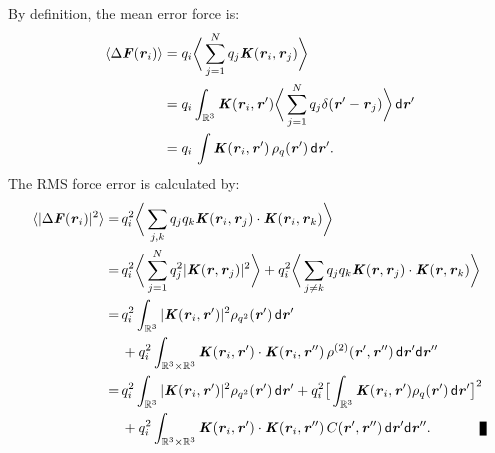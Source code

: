 \documentclass[aps,pre,preprint]{revtex4}
\renewcommand{\v}[1]{\textbf{\textit{#1}}}
\renewcommand{\d}[1]{\textsf{#1}}
\newenvironment{proof}[1][Proof]{\begin{trivlist}
\item[\hskip \labelsep {\bfseries #1}]}{\end{trivlist}}
\newcommand{\qed}{\nobreak \ifvmode \relax \else
      \ifdim\lastskip<1.5em \hskip-\lastskip
      \hskip1.5em plus0em minus0.5em \fi \nobreak
      \vrule height0.75em width0.5em depth0.25em\fi}
\begin{document}
\begin{proof}
  By definition, the mean error force is:
  \begin{align*}
    \langle\Delta\v F(\v r_i)\rangle
    &=
    q_i\bigg\langle \sum_{j=1}^Nq_j\v K(\v r_i,\v r_j)\bigg\rangle\\
    &=
    q_i\int_{\mathbb R^3}\v K(\v r_i, \v r')
    \bigg\langle \sum_{j=1}^Nq_j\delta (\v r' -\v r_j)\bigg\rangle
    \,\d d\v r'\\
    &= 
    q_i\,\int\v K(\v r_i,\v r')\,\rho_q(\v r')\,\d d\v r'.
  \end{align*}
  The RMS force error is calculated by:
  \begin{align} \nonumber
    \langle\vert\Delta\v F(\v r_i)\vert^2\rangle
    =\,&
    q_i^2\bigg\langle\sum_{j,k}
    q_jq_k\v K(\v r_i, \v r_j)\cdot\v K(\v r_i, \v r_k)\bigg\rangle \\ \nonumber
    =\,&
    q_i^2\bigg\langle\sum_{j=1}^N
    q_j^2\vert\v K(\v r, \v r_j)\vert^2
    \bigg\rangle +
    q_i^2\bigg\langle\sum_{j\neq k}
    q_jq_k \v K(\v r, \v r_j)\cdot\v K(\v r, \v r_k)
    \bigg\rangle \\ \nonumber
    =\,&
    q_i^2\int_{\mathbb R^3}
    \vert\v K(\v r_i, \v r')\vert^2\rho_{q^2}(\v r')\,\d d\v r'
    \\\label{eqn:prf-error-step3}
    & +
    q_i^2\int_{\mathbb R^3\times\mathbb R^3}
    \v K(\v r_i , \v r')\cdot\v K(\v r_i , \v r'')\,
    \rho^{(2)}(\v r', \v r'')
    \,\d d\v r'\d d\v r''\\\nonumber
    =\,&
    q_i^2\int_{\mathbb R^3}
    \vert\v K(\v r_i , \v r')\vert^2\rho_{q^2}(\v r')\,\d d\v r'
    +
    q_i^2
    \big[
    \int_{\mathbb R^3}
    \v K(\v r_i , \v r')\rho_{q}(\v r')\,\d d\v r'
    \big]^2
    \\ \nonumber
    & +
    q_i^2\int_{\mathbb R^3\times\mathbb R^3}
    \v K(\v r_i , \v r')\cdot\v K(\v r_i , \v r'')\,
    C(\v r', \v r'')
    \,\d d\v r'\d d\v r''.\qquad\qed
  \end{align}
\end{proof}
\end{document}
